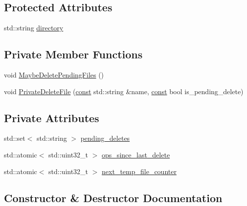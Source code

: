 \subsection*{Protected Attributes}
\begin{DoxyCompactItemize}
\item 
std\+::string \mbox{\hyperlink{classlucene_1_1core_1_1store_1_1FSDirectory_a284b79d993221839dd479e57ce556381}{directory}}
\end{DoxyCompactItemize}
\subsection*{Private Member Functions}
\begin{DoxyCompactItemize}
\item 
void \mbox{\hyperlink{classlucene_1_1core_1_1store_1_1FSDirectory_a9206f419d5fceb7a3a1bf71ce7f3047d}{Maybe\+Delete\+Pending\+Files}} ()
\item 
void \mbox{\hyperlink{classlucene_1_1core_1_1store_1_1FSDirectory_ab679ea582a711d7e79263d0022cbd0d7}{Private\+Delete\+File}} (\mbox{\hyperlink{ZlibCrc32_8h_a2c212835823e3c54a8ab6d95c652660e}{const}} std\+::string \&name, \mbox{\hyperlink{ZlibCrc32_8h_a2c212835823e3c54a8ab6d95c652660e}{const}} bool is\+\_\+pending\+\_\+delete)
\end{DoxyCompactItemize}
\subsection*{Private Attributes}
\begin{DoxyCompactItemize}
\item 
std\+::set$<$ std\+::string $>$ \mbox{\hyperlink{classlucene_1_1core_1_1store_1_1FSDirectory_a5adc58d180335b6ee768e746707f02c5}{pending\+\_\+deletes}}
\item 
std\+::atomic$<$ std\+::uint32\+\_\+t $>$ \mbox{\hyperlink{classlucene_1_1core_1_1store_1_1FSDirectory_af5440afc1ee53484e627fc4533fde7cb}{ops\+\_\+since\+\_\+last\+\_\+delete}}
\item 
std\+::atomic$<$ std\+::uint32\+\_\+t $>$ \mbox{\hyperlink{classlucene_1_1core_1_1store_1_1FSDirectory_a3b864798b29e7fc2fd1add7a3d5c3cee}{next\+\_\+temp\+\_\+file\+\_\+counter}}
\end{DoxyCompactItemize}


\subsection{Constructor \& Destructor Documentation}
\mbox{\label{classlucene_1_1core_1_1store_1_1FSDirectory_acb5f2add52231ebdbe138aad6d9cc0fb}} 
